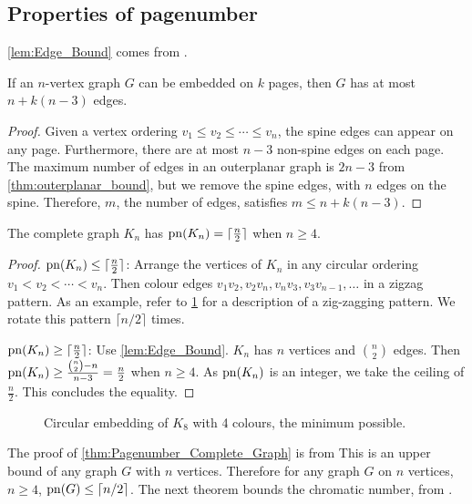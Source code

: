 \subsection{Properties of pagenumber}\label{ssec:Related_Properties}
\cref{lem:Edge_Bound} comes from \textcite{bernhartBookThicknessGraph1979}.
\begin{proposition}\label{lem:Edge_Bound}
	If an \(n\)-vertex graph \(G\) can be embedded on $k$ pages, then \(G\) has at most \(n + k(n-3)\) edges.
\end{proposition}
\begin{proof}
	Given a vertex ordering \(v_1 \leq v_2 \leq \cdots \leq v_n\), the spine edges can appear on any page. Furthermore, there are at most \(n-3\) non-spine edges on each page. The maximum number of edges in an outerplanar graph is \(2n - 3\) from \cref{thm:outerplanar_bound}, but we remove the spine edges, with \(n\) edges on the spine. Therefore, \(m\), the number of edges, satisfies \(m \leq n + k (n - 3)\).
\end{proof}
\begin{proposition}\label{thm:Pagenumber_Complete_Graph}
	The complete graph $K_n$ has $\operatorname{pn}(K_n) = \lceil \frac{n}{2} \rceil$ when $n \geq 4$.
\end{proposition}
\begin{proof}
	$\operatorname{pn}(K_n) \leq \lceil \frac{n}{2} \rceil$: Arrange the vertices of $K_n$ in any circular ordering $v_1 < v_2 < \cdots < v_n$. Then colour edges $v_1 v_2, v_2 v_{n}, v_{n} v_{3}, v_{3} v_{n-1}, \ldots$ in a zigzag pattern. As an example, refer to \cref{fig:k8 coloured with colours} for a description of a zig-zagging pattern. We rotate this pattern $\lceil n/2 \rceil$ times. 
	\par
	$\operatorname{pn}(K_n) \geq \lceil \frac{n}{2} \rceil$: Use \cref{lem:Edge_Bound}. \(K_n\) has \(n\) vertices and \(\binom{n}{2}\) edges. Then \(\operatorname{pn}(K_n) \geq \frac{\binom{n}{2} - n}{n - 3} = \frac{n}{2}\) when \(n \geq 4\). As \(\operatorname{pn}(K_n)\) is an integer, we take the ceiling of \(\frac{n}{2}\). This concludes the equality.
\end{proof}
\begin{figure}[ht]
	\caption{Circular embedding of \(K_8\) with 4 colours, the minimum possible.}
	\centering
	\label{fig:k8 coloured with colours}
\end{figure}
The proof of \cref{thm:Pagenumber_Complete_Graph} is from \textcite{bernhartBookThicknessGraph1979}
This is an upper bound of any graph \(G\) with \(n\) vertices.
Therefore for any graph \(G\) on \(n\) vertices, \(n \geq 4\), \(\operatorname{pn}(G) \leq \lceil n/2 \rceil\). The next theorem bounds the chromatic number, from \textcite{bernhartBookThicknessGraph1979}.

